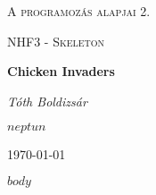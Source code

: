 \documentclass{article}
\begin{document}
\begin{titlepage}
    \centering
    {\scshape\LARGE A programozás alapjai 2. \par}
    {\scshape\Large NHF3 - Skeleton \par}
    \vspace{1.5cm}
    {\huge\bfseries Chicken Invaders \par}
    \vspace{2cm}
    {\Large\itshape Tóth Boldizsár \par}
	{\Large\itshape $neptun$ \par}
    \vfill
    {\large {}\today\par}
\end{titlepage}

$body$
\end{document}
